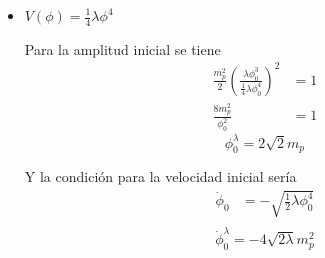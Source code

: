 \begin{itemize}
    Y la condición para la velocidad inicial sería
    \begin{equation*}
        \begin{split}
            \dot{\phi}_0 &= -\sqrt{\Lambda^4 \left[ 1 - \exp \left(- \frac{\phi_0}{M} \right) \right]^2}\\
            \dot{\phi}_0 &= -\Lambda^2 \left[ 1 - \exp \left( - \frac{\phi_0}{M} \right) \right]\\
            \dot{\phi}_0 &= -\Lambda^2 \left\{ 1 - \exp \left[ - \ln \left( \sqrt{2} \frac{m_p}{M} + 1 \right) \right] \right\}\\
            \dot{\phi}_0 &= -\Lambda^2 \left( 1 - \frac{1}{\sqrt{2} \frac{m_p}{M} + 1} \right)\\
            \dot{\phi}_0 &= -\Lambda^2 \frac{\sqrt{2} \frac{m_p}{M}}{\sqrt{2} \frac{m_p}{M} + 1}
        \end{split}
    \end{equation*}
    \begin{equation}
        \dot{\phi}_0^{s} = - \frac{\sqrt{2} \Lambda^2 m_p }{\sqrt{2} m_p + M}
    \end{equation}

    \newpage

    \item $\displaystyle V(\phi) = \frac{1}{4} \lambda \phi^4$
    
    Para la amplitud inicial se tiene
    \begin{equation*}
        \begin{split}
            \frac{m_p^2}{2} \left( \frac{\lambda \phi_0^3}{\frac{1}{4} \lambda \phi_0^4} \right)^2 &= 1\\
            \frac{8 m_p^2}{\phi_0^2} &= 1 
        \end{split}
    \end{equation*}
    \begin{equation}
        \phi_0^{\lambda} = 2 \sqrt{2} m_p
    \end{equation}

    Y la condición para la velocidad inicial sería
    \begin{equation*}
        \begin{split}
            \dot{\phi}_0 &= - \sqrt{\frac{1}{2} \lambda \phi_0^4}\\
        \end{split}
    \end{equation*}
    \begin{equation}
        \dot{\phi}_0^{\lambda} = - 4 \sqrt{2 \lambda} m_p^2
    \end{equation}


\end{itemize}
